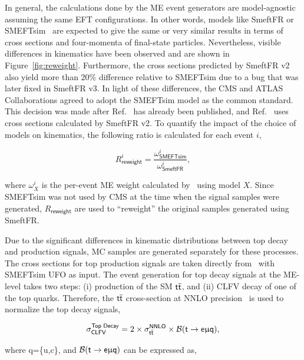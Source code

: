 In general, the calculations done by the \ac{ME} event generators are model-agnostic assuming the same \ac{EFT} configurations. In other words, models like SmeftFR or SMEFTsim~\cite{Brivio:2017btx} are expected to give the same or very similar results in terms of cross sections and four-momenta of final-state particles. Nevertheless, visible differences in kinematics have been observed and are shown in Figure~\ref{fig:reweight}. Furthermore, the cross sections predicted by SmeftFR v2 also yield more than 20\% difference relative to SMEFTsim due to a bug that was later fixed in SmeftFR v3. In light of these differences, the \ac{CMS} and \ac{ATLAS} Collaborations agreed to adopt the SMEFTsim model as the common standard. This decision was made after Ref.~\cite{CMS:2022ztx} has already been published, and Ref.~\cite{CMS:2022ztx} uses cross sections calculated by SmeftFR v2. To quantify the impact of the choice of models on kinematics, the following ratio is calculated for each event $i$,

\begin{equation}
\label{eq:2}
R_{\textsf{reweight}}^{i}=\frac{\omega_{\textsf{SMEFTsim}}^i}{\omega_{\textsf{SmeftFR}}^i},
\end{equation}

where $\omega^{i}_{X}$ is the per-event \ac{ME} weight calculated by \MG~using model $X$. Since SMEFTsim was not used by \ac{CMS} at the time when the signal samples were generated, $R_{\textsf{reweight}}$ are used to ``reweight'' the original samples generated using SmeftFR.

Due to the significant differences in kinematic distributions between top decay and production signals, \ac{MC} samples are generated separately for these processes. The cross sections for top production signals are taken directly from \MG~with SMEFTsim UFO as input. The event generation for top decay signals at the \ac{ME}-level takes two steps: (i) production of the SM $\textsf{t}\overline{\textsf{t}}$, and (ii) \ac{CLFV} decay of one of the top quarks. Therefore, the $\textsf{t}\overline{\textsf{t}}$ cross-section at \ac{NNLO} precision~\cite{Czakon:2011xx} is used to normalize the top decay signals,

\begin{equation}
\label{eq:3}
\sigma_{\textsf{CLFV}}^{\textsf{Top Decay}}=2\times\sigma_{\textsf{t}\overline{\textsf{t}}}^{\textsf{NNLO}}\times\mathcal{B}(\textsf{t}\rightarrow\textsf{e}\upmu\textsf{q}),
\end{equation}

where q=\{u,c\}, and $\mathcal{B}(\textsf{t}\rightarrow\textsf{e}\upmu\textsf{q})$ \cite{Kile:2008rp} can be expressed as,

